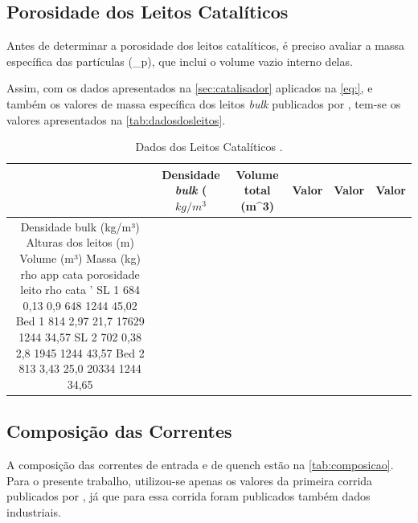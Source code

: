 
\subsection{Porosidade dos Leitos Catalíticos} \label{sec:propriedadesleitoscataliticos}

Antes de determinar a porosidade dos leitos catalíticos, é preciso avaliar a massa específica das partículas (\rho_{p}), que inclui o volume vazio interno delas. 



Assim, com os dados apresentados na \autoref{sec:catalisador} aplicados na \autoref{eq:}, e também os valores de massa específica dos leitos \emph{bulk} publicados por , tem-se os valores apresentados na \autoref{tab:dadosdosleitos}. 

\begin{table}[!htb]
\begin{center}
\caption{Dados dos Leitos Catalíticos \cite{Rojas2014a}.}
\label{tab:dadosdosleitos}
\small
\begin{tabular}{ccccc}
{} & {Densidade \emph{bulk} ($kg/m^3$} & {Volume total ({m^3})} & {Valor} & {Valor} & {Valor} 
\\
\hline
Densidade bulk (kg/m³)	Alturas dos leitos (m)	Volume (m³)	Massa (kg)	rho app cata	porosidade leito	rho cata '
SL 1	684	0,13	0,9	648	1244	45,02%
Bed 1	814	2,97	21,7	17629	1244	34,57%
SL 2	702	0,38	2,8	1945	1244	43,57%
Bed 2	813	3,43	25,0	20334	1244	34,65%
\bottomrule
\end{tabular}
\end{center}
\end{table}


\subsection{Composição das Correntes} \label{sec:composicaocorrentes}

A composição das correntes de entrada e de quench estão na
\autoref{tab:composicao}. Para o presente trabalho, utilizou-se
apenas os valores da primeira corrida publicados por
, já que para essa corrida foram publicados
também dados industriais.

